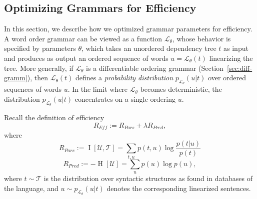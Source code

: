 \documentclass[10pt,twoside,lineno]{article}
\newcommand{\utterance}{\mathcal{U}}
\newcommand{\tree}{\mathcal{T}}
\begin{document}
\subsection{Optimizing Grammars for Efficiency}\label{sec:optim-eff}

In this section, we describe how we optimized grammar parameters for efficiency.
A word order grammar can be viewed as a function $\mathcal{L}_\theta$, whose behavior is specified by parameters $\theta$, which takes an unordered dependency tree $t$ as input and produces as output an ordered sequence of words $u = \mathcal{L}_\theta(t)$ linearizing the tree.
More generally, if $\mathcal{L}_\theta$ is a differentiable ordering grammar (Section~\ref{sec:diff-gramm}), then $\mathcal{L}_\theta(t)$ defines a \emph{probability distribution} $p_{\mathcal{L}_\theta}(u|t)$ over ordered sequences of words $u$.
In the limit where $\mathcal{L}_\theta$ becomes deterministic, the distribution $p_{\mathcal{L}_\theta}(u|t)$ concentrates on a single ordering $u$.

Recall the definition of efficiency
\begin{equation}\label{eq:efficiency-recall}
	R_{\textit{Eff}} := R_{\textit{Pars}} + \lambda R_\textit{Pred},
\end{equation}
where
\begin{equation}\label{eq:rpars}
	R_{Pars} := \operatorname{I}[\utterance,\tree] = \sum_{t,u} p(t,u) \log \frac{p(t|u)}{p(t)} 
\end{equation}
\begin{equation}
	R_{Pred} := - \operatorname{H}[\utterance] = \sum_{u} p(u) \log p(u),
\end{equation}
where $t \sim \tree$ is the distribution over syntactic structures as found in databases of the language, and $u \sim p_{\mathcal{L}_\theta}(u|t)$ denotes the corresponding linearized sentences.
\end{document}
